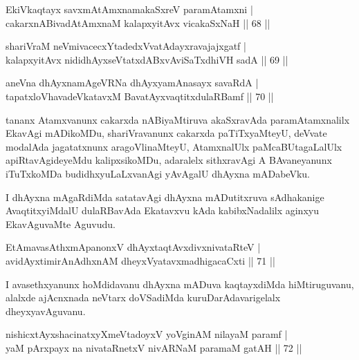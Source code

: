 \begin{shl}
EkiVkaqtayx savxmAtAmxnamakaSxreV paramAtamxni |\\
cakarxnABivadAtAmxnaM kalapxyitAvx vicakaSxNaH \hfill || 68 ||
\end{shl}
\begin{shl}
shariVraM neVmivacecxYtadedxVvatAdayxravajajxgatf |\\
kalapxyitAvx nididhAyxseVtatxdABxvAviSaTxdhiVH sadA \hfill || 69 ||
\end{shl}
\begin{shl}
aneVna dhAyxnamAgeVRNa dhAyxyamAnasayx savaRdA |\\
tapatxloVhavadeVkatavxM BavatAyxvaqtitxdulaRBamf \hfill || 70 ||
\end{shl}

\begin{artha}
tananx Atamxvanunx cakarxda nABiyaMtiruva akaSxravAda paramAtamxnalilx EkavAgi mADikoMDu, shariVravanunx cakarxda paTiTxyaMteyU, deVvate modalAda jagatatxnunx aragoVlinaMteyU, AtamxnalUlx paMcaBUtagaLalUlx apiRtavAgideyeMdu kalipxsikoMDu, adaralelx sithxravAgi A BAvaneyanunx iTuTxkoMDa budidhxyuLaLxvanAgi yAvAgalU dhAyxna mADabeVku.
\end{artha}



\begin{artha}
I dhAyxna mAgaRdiMda satatavAgi dhAyxna mADutitxruva sAdhakanige AvaqtitxyiMdalU dulaRBavAda Ekatavxvu kAda kabibxNadalilx aginxyu EkavAguvaMte Aguvudu.
\end{artha}

\begin{shl}
EtAmavasAthxmApanonxV dhAyxtaqtAvxdivxnivataRteV |\\
avidAyxtimirAnAdhxnAM dheyxVyatavxmadhigacaCxti \hfill || 71 ||
\end{shl}

\begin{artha}
I avasethxyanunx hoMdidavanu dhAyxna mADuva kaqtayxdiMda hiMtiruguvanu, alalxde ajAcnxnada neVtarx doVSadiMda kuruDarAdavarigelalx dheyxyavAguvanu.
\end{artha}


\begin{shl}
nishicxtAyxshacinatxyXmeVtadoyxV yoVginAM nilayaM paramf |\\
yaM pArxpayx na nivataRnetxV nivARNaM paramaM gatAH \hfill || 72 ||
\end{shl}

